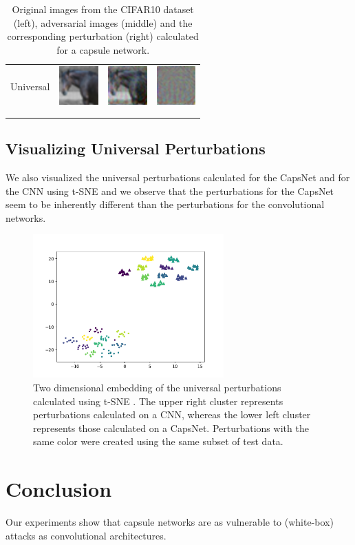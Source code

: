 \documentclass{article}
\begin{document}
\begin{table}[h]
\begin{tabular}{rlll}
	\\
	Universal & \includegraphics[height=1.5cm, align=c]{figures/universal_orig.pdf} & \includegraphics[height=1.5cm, align=c]{figures/universal_adversarial.pdf} & \includegraphics[height=1.5cm, align=c]{figures/universal_diff.pdf}\\
	\\
	\vspace{0.1cm}\\
	\end{tabular}
	\label{tab:images}
	\caption{Original images from the CIFAR10 dataset (left), adversarial images (middle) and the corresponding perturbation (right) calculated for a capsule network.}
\end{table}

\subsection{Visualizing Universal Perturbations}

We also visualized the universal perturbations calculated for the CapsNet and for the CNN using t-SNE \cite{tsne} and we observe that the perturbations for the CapsNet seem to be inherently different than the perturbations for the convolutional networks.
\begin{figure}
	\centering
	\includegraphics[height=5.5cm]{figures/tsne.pdf}
	\caption{Two dimensional embedding of the universal perturbations calculated using t-SNE \cite{tsne}. The upper right cluster represents perturbations calculated on a CNN, whereas the lower left cluster represents those calculated on a CapsNet. Perturbations with the same color were created using the same subset of test data.}
\end{figure}


\FloatBarrier
\section{Conclusion}
Our experiments show that capsule networks are as vulnerable to (white-box) attacks as convolutional architectures.



\end{document}
